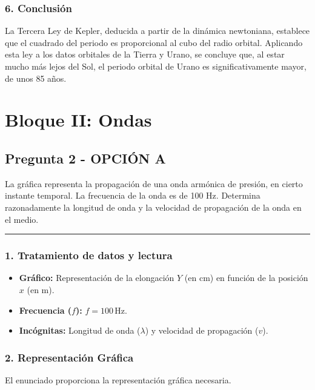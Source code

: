 \subsubsection*{6. Conclusión}
\begin{cajaconclusion}
La Tercera Ley de Kepler, deducida a partir de la dinámica newtoniana, establece que el cuadrado del periodo es proporcional al cubo del radio orbital. Aplicando esta ley a los datos orbitales de la Tierra y Urano, se concluye que, al estar mucho más lejos del Sol, el periodo orbital de Urano es significativamente mayor, de unos 85 años.
\end{cajaconclusion}
\newpage

\section{Bloque II: Ondas}
\label{sec:ondas_2018_jul_ext}

\subsection{Pregunta 2 - OPCIÓN A}
\label{subsec:2A_2018_jul_ext}
\begin{cajaenunciado}
La gráfica representa la propagación de una onda armónica de presión, en cierto instante temporal. La frecuencia de la onda es de 100 Hz. Determina razonadamente la longitud de onda y la velocidad de propagación de la onda en el medio.
\end{cajaenunciado}
\hrule
\subsubsection*{1. Tratamiento de datos y lectura}
\begin{itemize}
    \item \textbf{Gráfico:} Representación de la elongación $Y$ (en cm) en función de la posición $x$ (en m).
    \item \textbf{Frecuencia ($f$):} $f=100\,\text{Hz}$.
    \item \textbf{Incógnitas:} Longitud de onda ($\lambda$) y velocidad de propagación ($v$).
\end{itemize}
\subsubsection*{2. Representación Gráfica}
El enunciado proporciona la representación gráfica necesaria.
